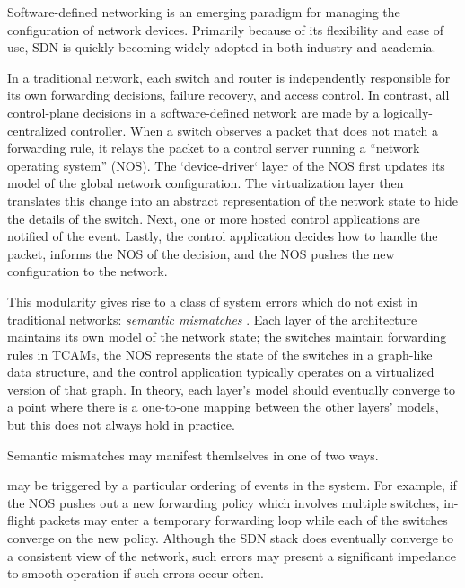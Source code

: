 Software-defined networking is an emerging paradigm for managing the
configuration of network devices. Primarily because of its flexibility and ease of use, SDN is
quickly becoming widely adopted in both industry and academia. 

In a traditional network, each switch and router is independently responsible for
its own forwarding decisions, failure recovery, and access control. In
contrast, all control-plane decisions in a software-defined network are made by
a logically-centralized controller. When a
switch observes a packet that does not match a forwarding rule, 
it relays the packet to a control server running a ``network operating system''
(NOS). The `device-driver` layer of the NOS first updates its model of the global network configuration.
The virtualization layer then translates this change into an abstract 
representation of the network state to hide the details of the switch. Next, one or more hosted control
applications are notified of the event. Lastly, the
control application decides how to handle the packet, informs the NOS of the decision,
and the NOS pushes the new configuration to the network.


This modularity gives rise to a class of system errors which do not exist in
traditional networks: {\it semantic mismatches} . Each layer of the architecture
maintains its own model of the network state; the switches maintain forwarding
rules in TCAMs, the NOS represents the state of the switches in a graph-like data
structure, and the control application typically operates on 
a virtualized version of that graph. In theory, each layer's model should eventually
converge to a point where there is a one-to-one mapping 
between the other layers' models, but this does not always hold in practice.

Semantic mismatches may manifest themlselves in one of two ways.

 

 may be triggered by a particular ordering of
events in the system. For example, if the NOS pushes out a new forwarding policy
which involves multiple switches, in-flight packets may enter a
temporary forwarding loop while each of the switches converge on the new policy.
 Although the SDN stack does eventually converge to
a consistent view of the network, such errors may present a significant
impedance to smooth operation if such errors occur often. 

